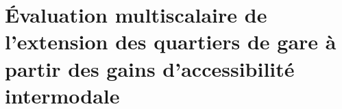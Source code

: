 
\chapter
{Évaluation multiscalaire de l'extension des quartiers de gare à partir des gains d'accessibilité intermodale
    \label{chap5:titre}
    }
    \begin{refsegment}



\end{refsegment}
